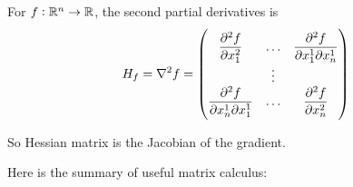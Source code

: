 \begin{definition}
    For $f: \mathbb{R}^n \rightarrow \mathbb{R}$, the second partial derivatives is
    \begin{equation}
        H_f = \nabla^2 f = \begin{pmatrix}
            \dpd[2]{f}{x_1} & \hdots & \dmd{f}{2}{x_1}{1}{x_n}{1} \\
            & \vdots \\
            \dmd{f}{2}{x_n}{1}{x_1}{1} & \hdots & \dpd[2]{f}{x_n}
        \end{pmatrix}
    \end{equation}
    
    So Hessian matrix is the Jacobian of the gradient.
\end{definition}

Here is the summary of useful matrix calculus:

